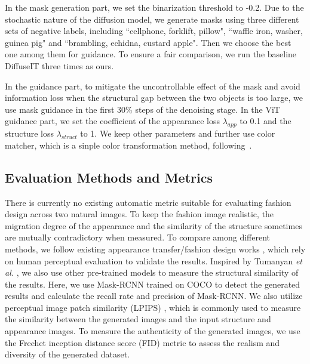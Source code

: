 In the mask generation part, we set the binarization threshold to -0.2. Due to the stochastic nature of the diffusion model, we generate masks using three different sets of negative labels, including ``cellphone, forklift, pillow", ``waffle iron, washer, guinea pig" and ``brambling, echidna, custard apple". Then we choose the best one among them for guidance. To ensure a fair comparison, we run the baseline DiffuseIT \cite{kwon2022diffusion} three times as ours.

In the guidance part, to mitigate the uncontrollable effect of the mask and avoid information loss when the structural gap between the two objects is too large, we use mask guidance in the first 30\% steps of the denoising stage. In the ViT guidance part, we set the coefficient of the appearance loss $\lambda_{app}$ to 0.1 and the structure loss $\lambda_{struct}$ to 1. We keep other parameters and further use color matcher, which is a sinple color transformation method, following~\cite{kwon2022diffusion}.

\subsection{Evaluation Methods and Metrics} 
There is currently no existing automatic metric suitable for evaluating fashion design across two natural images. To keep the fashion image realistic, the migration degree of the appearance and the similarity of the structure sometimes are mutually contradictory when measured. To compare among different methods, we follow existing appearance transfer/fashion design works \cite{tumanyan2022splicing,kwon2022diffusion,jing2019neural,kim2020deformable,mechrez2018contextual,park2020swapping}, which rely on human perceptual evaluation to validate the results. 
Inspired by Tumanyan \textit{et al.} \cite{tumanyan2022splicing}, we also use other pre-trained models to measure the structural similarity of the results. Here, we use Mask-RCNN \cite{he2017mask} trained on COCO \cite{lin2014microsoft} to detect the generated results and calculate the recall rate and precision of Mask-RCNN. We also utilize perceptual image patch similarity (LPIPS) \cite{zhang2018unreasonable}, which is commonly used to measure the similarity between the generated images and the input structure and appearance images. To measure the authenticity of the generated images, we use the Frechet inception distance score (FID) \cite{heusel2017gans} metric to assess the realism and diversity of the generated dataset.

